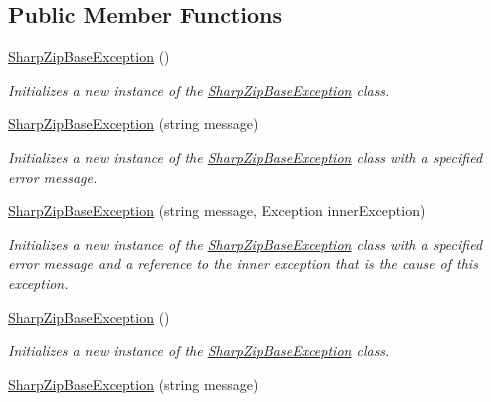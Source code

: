 \subsection*{Public Member Functions}
\begin{DoxyCompactItemize}
\item 
\hyperlink{class_i_c_sharp_code_1_1_sharp_zip_lib_1_1_sharp_zip_base_exception_a9f3a4dc4d0a64f39aac7fa7705c0e497}{Sharp\+Zip\+Base\+Exception} ()
\begin{DoxyCompactList}\small\item\em Initializes a new instance of the \hyperlink{class_i_c_sharp_code_1_1_sharp_zip_lib_1_1_sharp_zip_base_exception}{Sharp\+Zip\+Base\+Exception} class. \end{DoxyCompactList}\item 
\hyperlink{class_i_c_sharp_code_1_1_sharp_zip_lib_1_1_sharp_zip_base_exception_aed7cfb9170371c9682040721aab44017}{Sharp\+Zip\+Base\+Exception} (string message)
\begin{DoxyCompactList}\small\item\em Initializes a new instance of the \hyperlink{class_i_c_sharp_code_1_1_sharp_zip_lib_1_1_sharp_zip_base_exception}{Sharp\+Zip\+Base\+Exception} class with a specified error message. \end{DoxyCompactList}\item 
\hyperlink{class_i_c_sharp_code_1_1_sharp_zip_lib_1_1_sharp_zip_base_exception_ab56a3ebc05b9603c4eb14e47321c95f0}{Sharp\+Zip\+Base\+Exception} (string message, Exception inner\+Exception)
\begin{DoxyCompactList}\small\item\em Initializes a new instance of the \hyperlink{class_i_c_sharp_code_1_1_sharp_zip_lib_1_1_sharp_zip_base_exception}{Sharp\+Zip\+Base\+Exception} class with a specified error message and a reference to the inner exception that is the cause of this exception. \end{DoxyCompactList}\item 
\hyperlink{class_i_c_sharp_code_1_1_sharp_zip_lib_1_1_sharp_zip_base_exception_a9f3a4dc4d0a64f39aac7fa7705c0e497}{Sharp\+Zip\+Base\+Exception} ()
\begin{DoxyCompactList}\small\item\em Initializes a new instance of the \hyperlink{class_i_c_sharp_code_1_1_sharp_zip_lib_1_1_sharp_zip_base_exception}{Sharp\+Zip\+Base\+Exception} class. \end{DoxyCompactList}\item 
\hyperlink{class_i_c_sharp_code_1_1_sharp_zip_lib_1_1_sharp_zip_base_exception_aed7cfb9170371c9682040721aab44017}{Sharp\+Zip\+Base\+Exception} (string message)

\end{DoxyCompactItemize}
